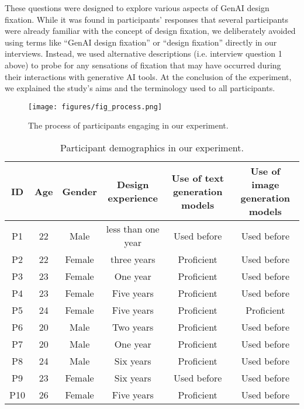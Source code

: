 These questions were designed to explore various aspects of GenAI design fixation. While it was found in participants' responses that several participants were already familiar with the concept of design fixation, we deliberately avoided using terms like “GenAI design fixation” or “design fixation” directly in our interviews. Instead, we used alternative descriptions  (i.e. interview question 1 above) to probe for any sensations of fixation that may have occurred during their interactions with generative AI tools. At the conclusion of the experiment, we explained the study’s aims and the terminology used to all participants.


\begin{figure*}[htp]
    \centering
    \texttt{[image: figures/fig\_process.png]}
    \caption{The process of participants engaging in our experiment.}
    \vspace{-0.05in}
    \label{fig:experiment}
    \Description{}
\end{figure*}


\begin{table}[ht]
\centering
\caption{Participant demographics in our experiment.}
\label{tab:participants}
\begin{tabular}{@{}cccccc@{}}
\toprule
\textbf{ID} & \textbf{Age} & \textbf{Gender} & \textbf{Design experience} & \textbf{Use of text generation models} & \textbf{Use of image generation models} \\ \midrule
P1 & 22 & Male & less than one year & Used before & Used before\\
P2 & 22 & Female & three years & Proficient & Used before \\
P3 & 23 & Female & One year & Proficient & Used before \\
P4 & 23 & Female & Five years & Proficient & Used before \\
P5 & 24 & Female & Five years & Proficient & Proficient \\
P6 & 20 & Male & Two years & Proficient & Used before \\
P7 & 20 & Male & One year & Proficient & Used before \\
P8 & 24 & Male & Six years & Proficient & Used before \\
P9 & 23 & Female & Six years & Used before & Used before \\
P10 & 26 & Female & Five years & Proficient & Used before \\ \bottomrule
\end{tabular}
\end{table}

